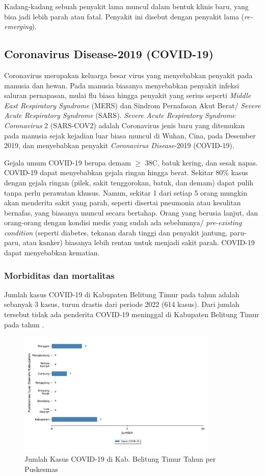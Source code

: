 Kadang-kadang sebuah penyakit lama muncul dalam bentuk klinis baru, yang bisa jadi lebih parah atau fatal.
Penyakit ini disebut dengan penyakit lama (\textit{re-emerging}).

\subsection{Coronavirus Disease-2019 (COVID-19)}
Coronavirus merupakan keluarga besar virus yang menyebabkan penyakit pada manusia dan hewan.
Pada manusia biasanya menyebabkan penyakit infeksi saluran pernapasan, mulai flu biasa hingga penyakit yang serius seperti \textit{Middle East Respiratory Syndrome} (MERS) dan Sindrom Pernafasan Akut Berat/ \textit{Severe Acute Respiratory Syndrome} (SARS).
\textit{Severe Acute Respiratory Syndrome Coronavirus} 2 (SARS-COV2) adalah Coronavirus jenis baru yang ditemukan pada manusia sejak kejadian luar biasa muncul di Wuhan, Cina, pada Desember 2019, dan menyebabkan penyakit \textit{Coronavirus Disease}-2019 (COVID-19).

Gejala umum COVID-19 berupa demam $\geq$ 38\textdegree C, batuk kering, dan sesak napas.
COVID-19 dapat menyebabkan gejala ringan hingga berat.
Sekitar 80\% kasus dengan gejala ringan (pilek, sakit tenggorokan, batuk, dan demam) dapat pulih tanpa perlu perawatan khusus.
Namun, sekitar 1 dari setiap 5 orang mungkin akan menderita sakit yang parah, seperti disertai pneumonia atau kesulitan bernafas, yang biasanya muncul secara bertahap.
Orang yang berusia lanjut, dan orang-orang dengan kondisi medis yang sudah ada sebelumnya/ \emph{pre-existing condition} (seperti diabetes, tekanan darah tinggi dan penyakit jantung, paru-paru, atau kanker) biasanya lebih rentan untuk menjadi sakit parah.
COVID-19 dapat menyebabkan kematian.

\subsubsection{Morbiditas dan mortalitas}
Jumlah kasus COVID-19 di Kabupaten Belitung Timur pada tahun \tP adalah sebanyak 3 kasus, turun drastis dari periode 2022 (614 kasus). 
Dari jumlah tersebut tidak ada penderita COVID-19 meninggal di Kabupaten Belitung Timur pada tahun \tP.

\begin{figure}[H]
	\centering
	\includegraphics[width=0.85\textwidth]{bab_06/bab_06_17a_kasusCovid}
	\caption{Jumlah Kasus COVID-19 di Kab. Belitung Timur Tahun \tP per Puskesmas}
	\label{fig:Kasus-COVID}
\end{figure}

